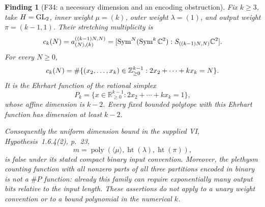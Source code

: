 \documentclass[11pt,a4paper]{article}
\newcommand{\R}{\mathbb R}
\newcommand{\fid}[1]{\textsf{#1}}\newcommand{\gate}[1]{\textsf{#1}}
\theoremstyle{named}\newtheorem{finding}{Finding}[section]
\theoremstyle{definition}\newtheorem{definition}[finding]{Definition}
\theoremstyle{remark}\newtheorem{remark}[finding]{Remark}
\begin{document}
\begin{finding}[\fid{F34}: a necessary dimension and an encoding obstruction]\label{f:binarydimension}
Fix $k\ge3$, take $H=\mathrm{GL}_2$, inner weight $\mu=(k)$,
outer weight $\lambda=(1)$, and output weight $\pi=(k-1,1)$.
Their stretching multiplicity is
\[
 c_k(N)=a^{((k-1)N,N)}_{(N),(k)}
       =[\operatorname{Sym}^N(\operatorname{Sym}^k\mathbb C^2):S_{((k-1)N,N)}\mathbb C^2].
\]
For every $N\ge0$,
\[
 c_k(N)=
 \#\{(x_2,\ldots,x_k)\in\mathbb Z_{\ge0}^{k-1}:
                          2x_2+\cdots+kx_k=N\}.
\]
It is the Ehrhart function of the rational simplex
\[
 P_k=\{x\in\R_{\ge0}^{k-1}:2x_2+\cdots+kx_k=1\},
\]
whose affine dimension is $k-2$. Every fixed bounded polytope with this
Ehrhart function has dimension at least $k-2$.

Consequently the uniform dimension bound in the supplied
VI, Hypothesis~1.6.4(2), p.~23,
\[
 m=\operatorname{poly}
   (\langle\mu\rangle,\operatorname{ht}(\lambda),
                         \operatorname{ht}(\pi)),
\]
is false under its stated compact binary input convention.
Moreover, the plethysm counting function with all nonzero parts of
all three partitions encoded in binary is not a $\#P$ function:
already this family can require exponentially many output bits
relative to the input length.
These assertions do not apply to a unary weight convention or to
a bound polynomial in the numerical $k$.
\end{finding}
\end{document}
